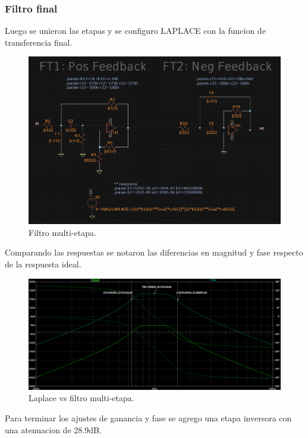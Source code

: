 \subsubsection{Filtro final}

Luego se unieron las etapas y se configuro LAPLACE con la funcion de transferencia final.

\begin{figure}[H]
    \centering
    \includegraphics[scale=.4]{Secciones/Circ1/img/schLpBP.png}
    \caption{Filtro multi-etapa.}
    \label{schPos}
\end{figure}

Comparando las respuestas se notaron las diferencias en magnitud y fase respecto de la respuesta ideal.

\begin{figure}[H]
    \centering
    \includegraphics[scale=.3]{Secciones/Circ1/img/lpVsBP.png}
    \caption{Laplace vs filtro multi-etapa.}
    \label{schPos}
\end{figure}

Para terminar los ajustes de ganancia y fase se agrego una etapa inversora con una atenuacion de 28.9dB.

